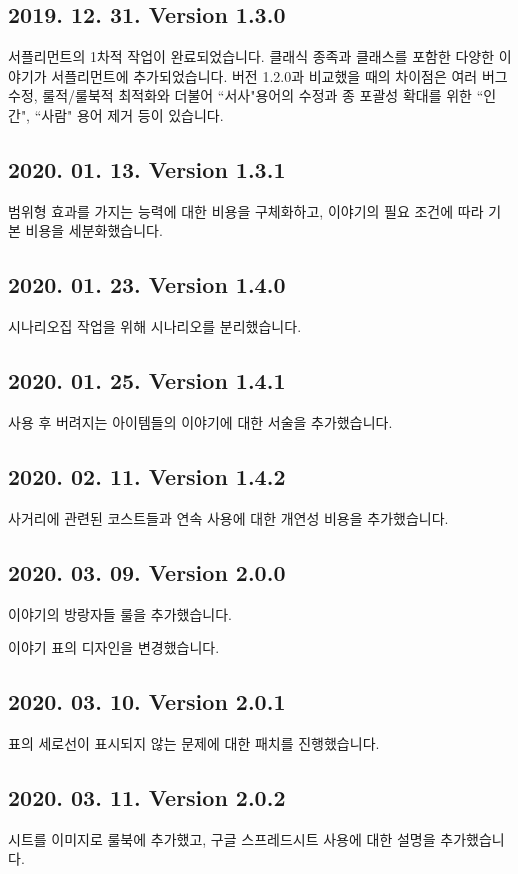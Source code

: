 \documentclass{report}
\begin{document}
	\subsection*{2019. 12. 31. Version 1.3.0}
	서플리먼트의 1차적 작업이 완료되었습니다. 클래식 종족과 클래스를 포함한 다양한 이야기가 서플리먼트에 추가되었습니다. 버전 1.2.0과 비교했을 때의 차이점은 여러 버그 수정, 룰적/룰북적 최적화와 더불어 ``서사"용어의 수정과 종 포괄성 확대를 위한 ``인간", ``사람" 용어 제거 등이 있습니다.
	
	\subsection*{2020. 01. 13. Version 1.3.1}
	범위형 효과를 가지는 능력에 대한 비용을 구체화하고, 이야기의 필요 조건에 따라 기본 비용을 세분화했습니다.
	
	\subsection*{2020. 01. 23. Version 1.4.0}
	시나리오집 작업을 위해 시나리오를 분리했습니다.
	
	\subsection*{2020. 01. 25. Version 1.4.1}
	사용 후 버려지는 아이템들의 이야기에 대한 서술을 추가했습니다.
	
	\subsection*{2020. 02. 11. Version 1.4.2}
	사거리에 관련된 코스트들과 연속 사용에 대한 개연성 비용을 추가했습니다.
\fi
	
	\subsection*{2020. 03. 09. Version 2.0.0}
\iffullchangelog
	이야기의 방랑자들 룰을 추가했습니다.
	
	이야기 표의 디자인을 변경했습니다.
	
	\subsection*{2020. 03. 10. Version 2.0.1}
	표의 세로선이 표시되지 않는 문제에 대한 패치를 진행했습니다.
	
	\subsection*{2020. 03. 11. Version 2.0.2}
	시트를 이미지로 룰북에 추가했고, 구글 스프레드시트 사용에 대한 설명을 추가했습니다.
	
\end{document}
